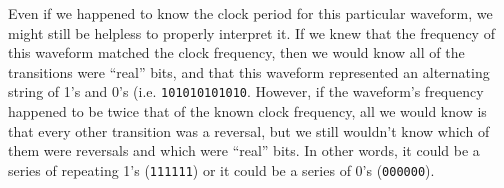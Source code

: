 \vskip 10pt

Even if we happened to know the clock period for this particular waveform, we might still be helpless to properly interpret it.  If we knew that the frequency of this waveform matched the clock frequency, then we would know all of the transitions were ``real'' bits, and that this waveform represented an alternating string of 1's and 0's (i.e. {\tt 101010101010}.  However, if the waveform's frequency happened to be twice that of the known clock frequency, all we would know is that every other transition was a reversal, but we still wouldn't know which of them were reversals and which were ``real'' bits.  In other words, it could be a series of repeating 1's ({\tt 111111}) or it could be a series of 0's ({\tt 000000}).




